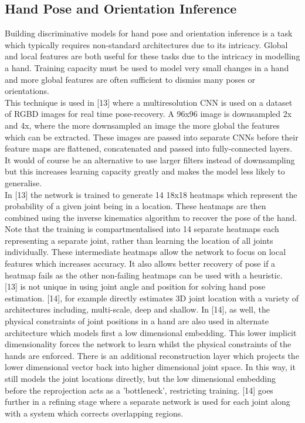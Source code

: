 \documentclass{article}
\begin{document}
\subsection*{Hand Pose and Orientation Inference}
Building discriminative models for hand pose and orientation inference is a task which typically requires non-standard architectures due to its intricacy. Global and local features are both useful for these tasks due to the intricacy in modelling a hand. Training capacity must be used to model very small changes in a hand and more global features are often sufficient to dismiss many poses or orientations.\\

This technique is used in [13] where a multiresolution CNN is used on a dataset of RGBD images for real time pose-recovery. A 96x96 image is downsampled 2x and 4x, where the more downsampled an image the more global the features which can be extracted. These images are passed into separate CNNs before their feature maps are flattened, concatenated and passed into fully-connected layers. It would of course be an alternative to use larger filters instead of downsampling but this increases learning capacity greatly and makes the model less likely to generalise.\\

In [13] the network is trained to generate 14 18x18 heatmaps which represent the probability of a given joint being in a location. These heatmaps are then combined using the inverse kinematics algorithm to recover the pose of the hand. Note that the training is compartmentalised into 14 separate heatmaps each representing a separate joint, rather than learning the location of all joints individually. These intermediate heatmaps allow the network to focus on local features which increases accuracy. It also allows better recovery of pose if a heatmap fails as the other non-failing heatmaps can be used with a heuristic.\\

[13] is not unique in using joint angle and position for solving hand pose estimation. [14], for example directly estimates 3D joint location with a variety of architectures including, multi-scale, deep and shallow. In [14], as well, the physical constraints of joint positions in a hand are also used in alternate architecture which models first a low dimensional embedding. This lower implicit dimensionality forces the network to learn whilst the physical constraints of the hands are enforced. There is an additional reconstruction layer which projects the lower dimensional vector back into higher dimensional joint space. In this way, it still models the joint locations directly, but the low dimensional embedding before the reprojection acts as a 'bottleneck', restricting training. [14] goes further in a refining stage where a separate network is used for each joint along with a system which corrects overlapping regions.\\
\end{document}
